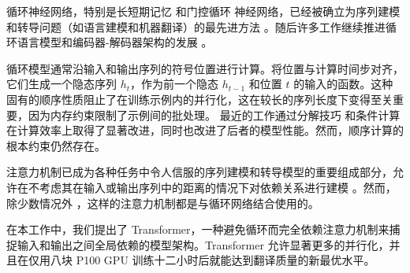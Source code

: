 循环神经网络，特别是长短期记忆 \citep{hochreiter1997} 和门控循环 \citep{gruEval14} 神经网络，已经被确立为序列建模和转导问题（如语言建模和机器翻译）的最先进方法 \citep{sutskever14, bahdanau2014neural, cho2014learning}。随后许多工作继续推进循环语言模型和编码器-解码器架构的发展 \citep{wu2016google,luong2015effective,jozefowicz2016exploring}。

循环模型通常沿输入和输出序列的符号位置进行计算。将位置与计算时间步对齐，它们生成一个隐态序列 $h_t$，作为前一个隐态 $h_{t-1}$ 和位置 $t$ 的输入的函数。这种固有的顺序性质阻止了在训练示例内的并行化，这在较长的序列长度下变得至关重要，因为内存约束限制了示例间的批处理。
最近的工作通过分解技巧 \citep{Kuchaiev2017Factorization} 和条件计算 \citep{shazeer2017outrageously} 在计算效率上取得了显著改进，同时也改进了后者的模型性能。然而，顺序计算的根本约束仍然存在。


注意力机制已成为各种任务中令人信服的序列建模和转导模型的重要组成部分，允许在不考虑其在输入或输出序列中的距离的情况下对依赖关系进行建模 \citep{bahdanau2014neural, structuredAttentionNetworks}。然而，除少数情况外 \citep{decomposableAttnModel}，这样的注意力机制都是与循环网络结合使用的。


在本工作中，我们提出了 Transformer，一种避免循环而完全依赖注意力机制来捕捉输入和输出之间全局依赖的模型架构。Transformer 允许显著更多的并行化，并且在仅用八块 P100 GPU 训练十二小时后就能达到翻译质量的新最优水平。 

